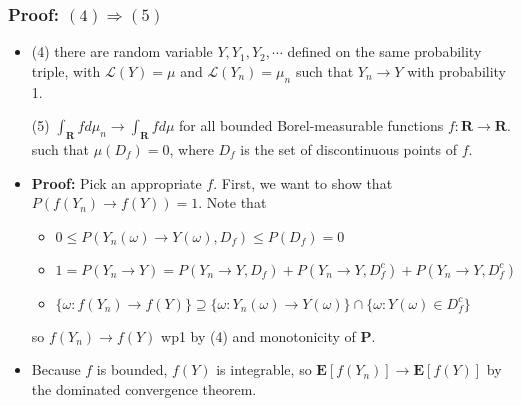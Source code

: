 \documentclass[handout]{beamer}
\newcommand{\BP}{\mathbf{P}}
\newcommand{\BE}{\mathbf{E}}
\begin{document}
\frame
{
  \frametitle{Proof: $(4) \Rightarrow (5)$ } 

   \begin{itemize}

\item<1->
               


               (4) there are random variable $Y, Y_1, Y_2, \cdots$ defined on the same probability triple, with $\mathcal{L} (Y)=\mu$ and $\mathcal{L} (Y_n)=\mu_n $ such that $Y_n\rightarrow Y$ with probability 1.
                                                           \vspace{2mm}
                                                           
                                                           

            {\color{blue}   (5) $\int_{\mathbf{R}}f d\mu_n \rightarrow \int_{\mathbf{R}}f d\mu$ for all bounded Borel-measurable functions $f:\mathbf{R}\rightarrow \mathbf{R}$. such that $\mu(D_f)=0$, where $D_f$ is the set of discontinuous points of $f$. }
              
                                            \vspace{2mm}

               
\item<2-> \textbf{Proof:} Pick an appropriate $f$. First, we want to show that $P\left( f(Y_n) \to f(Y) \right) = 1$. Note that
\begin{itemize}
\item $0 \le P(Y_n(\omega) \to Y(\omega), D_f) \le P( D_f) = 0$
\item$1 = P(Y_n \to Y) = P(Y_n \to Y, D_f) + P(Y_n \to Y, D_f^c) +  P(Y_n \to Y, D_f^c)$
\item $\{\omega : f(Y_n) \to f(Y)\} \supseteq \{\omega :  Y_n(\omega) \to Y(\omega)\} \cap \{\omega :  Y(\omega) \in D_f^c \}$
\end{itemize}
so $f(Y_n) \to f(Y)$ wp1 by (4) and monotonicity of $\BP$.

\item<3->[-] Because $f$ is bounded, $f(Y)$ is integrable, so $\BE[f(Y_n)]\rightarrow \BE[f(Y)]$ by the dominated convergence theorem.

\end{itemize}
}
\end{document}
